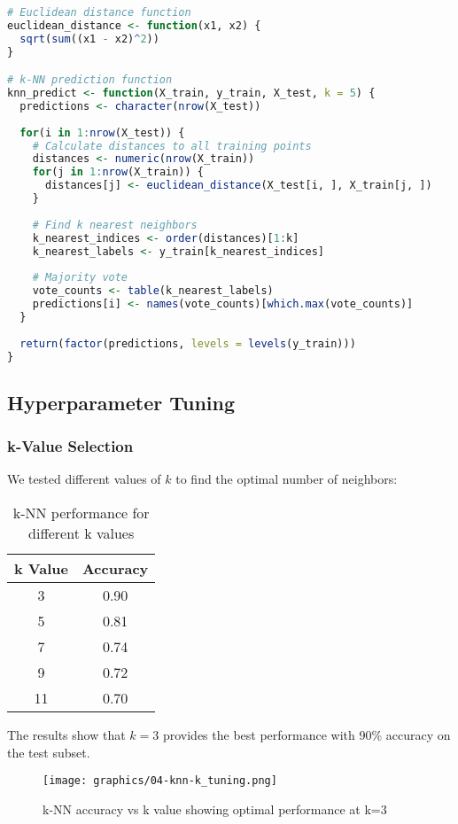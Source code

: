 \begin{lstlisting}[language=R]
# Euclidean distance function
euclidean_distance <- function(x1, x2) {
  sqrt(sum((x1 - x2)^2))
}

# k-NN prediction function
knn_predict <- function(X_train, y_train, X_test, k = 5) {
  predictions <- character(nrow(X_test))
  
  for(i in 1:nrow(X_test)) {
    # Calculate distances to all training points
    distances <- numeric(nrow(X_train))
    for(j in 1:nrow(X_train)) {
      distances[j] <- euclidean_distance(X_test[i, ], X_train[j, ])
    }
    
    # Find k nearest neighbors
    k_nearest_indices <- order(distances)[1:k]
    k_nearest_labels <- y_train[k_nearest_indices]
    
    # Majority vote
    vote_counts <- table(k_nearest_labels)
    predictions[i] <- names(vote_counts)[which.max(vote_counts)]
  }
  
  return(factor(predictions, levels = levels(y_train)))
}
\end{lstlisting}

\subsection{Hyperparameter Tuning}
\subsubsection{k-Value Selection}
We tested different values of $k$ to find the optimal number of neighbors:

\begin{table}[H]
\centering
\caption{k-NN performance for different k values}
\label{tab:knn-k-values}
\begin{tabular}{cc}
\toprule
\textbf{k Value} & \textbf{Accuracy} \\
\midrule
3 & 0.90 \\
5 & 0.81 \\
7 & 0.74 \\
9 & 0.72 \\
11 & 0.70 \\
\bottomrule
\end{tabular}
\end{table}

The results show that $k = 3$ provides the best performance with 90\% accuracy on the test subset.

\begin{figure}[H]
\centering
\texttt{[image: graphics/04-knn-k\_tuning.png]}
\caption{k-NN accuracy vs k value showing optimal performance at k=3}
\label{fig:knn-k-tuning}
\end{figure}


